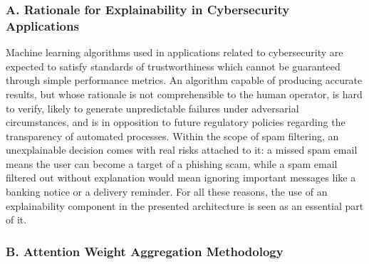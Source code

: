 \subsubsection{A. Rationale for Explainability in Cybersecurity
Applications}\label{a.-rationale-for-explainability-in-cybersecurity-applications}

Machine learning algorithms used in applications related to
cybersecurity are expected to satisfy standards of trustworthiness which
cannot be guaranteed through simple performance metrics. An algorithm
capable of producing accurate results, but whose rationale is not
comprehensible to the human operator, is hard to verify, likely to
generate unpredictable failures under adversarial circumstances, and is
in opposition to future regulatory policies regarding the transparency
of automated processes. Within the scope of spam filtering, an
unexplainable decision comes with real risks attached to it: a missed
spam email means the user can become a target of a phishing scam, while
a spam email filtered out without explanation would mean ignoring
important messages like a banking notice or a delivery reminder. For all
these reasons, the use of an explainability component in the presented
architecture is seen as an essential part of it.

\subsubsection{B. Attention Weight Aggregation
Methodology}\label{b.-attention-weight-aggregation-methodology}

